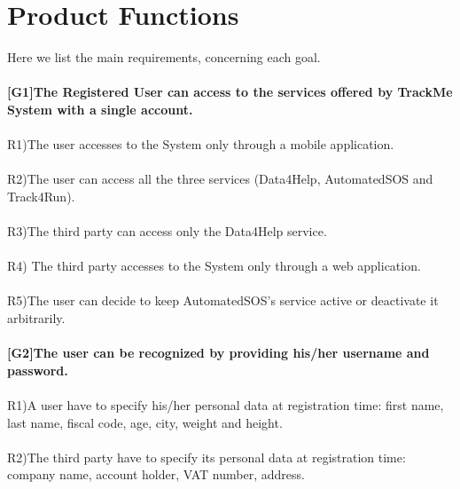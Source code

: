 \section{Product Functions}

Here we list the main requirements, concerning each goal. \\ \\
\textbf{[G1]The Registered User can access to the services offered by TrackMe System with a single account. } \\ \\
R1)The user accesses to the System only through a mobile application. \\ \\
R2)The user can access all the three services (Data4Help, AutomatedSOS and Track4Run). \\ \\
R3)The third party can access only the Data4Help service. \\ \\
R4) The third party accesses to the System only through a web application. \\ \\
R5)The user can decide to keep AutomatedSOS's service active or deactivate it arbitrarily. \\ \\
\textbf{[G2]The user can be recognized by providing his/her username and password.} \\ \\
R1)A user  have to specify his/her personal data at registration time: first name,  last name, fiscal code, age, city, weight and height. \\ \\
R2)The third party have to specify its personal data at registration time: company name, account holder, VAT number, address. \newline \newline


